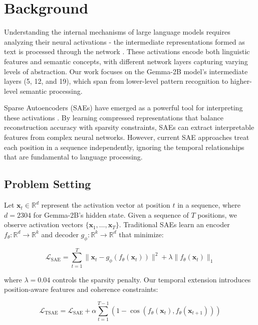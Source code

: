 \section{Background}
Understanding the internal mechanisms of large language models requires analyzing their neural activations - the intermediate representations formed as text is processed through the network \cite{elhage2022solu}. These activations encode both linguistic features and semantic concepts, with different network layers capturing varying levels of abstraction. Our work focuses on the Gemma-2B model's intermediate layers (5, 12, and 19), which span from lower-level pattern recognition to higher-level semantic processing.

Sparse Autoencoders (SAEs) have emerged as a powerful tool for interpreting these activations \cite{anthropic2022decomposition}. By learning compressed representations that balance reconstruction accuracy with sparsity constraints, SAEs can extract interpretable features from complex neural networks. However, current SAE approaches treat each position in a sequence independently, ignoring the temporal relationships that are fundamental to language processing.

\subsection{Problem Setting}
Let $\mathbf{x}_t \in \mathbb{R}^d$ represent the activation vector at position $t$ in a sequence, where $d=2304$ for Gemma-2B's hidden state. Given a sequence of $T$ positions, we observe activation vectors $\{\mathbf{x}_1, \ldots, \mathbf{x}_T\}$. Traditional SAEs learn an encoder $f_\theta\colon \mathbb{R}^d \rightarrow \mathbb{R}^k$ and decoder $g_\phi\colon \mathbb{R}^k \rightarrow \mathbb{R}^d$ that minimize:

\begin{equation}
\mathcal{L}_{\text{SAE}} = \sum_{t=1}^T \|\mathbf{x}_t - g_\phi(f_\theta(\mathbf{x}_t))\|^2 + \lambda\|f_\theta(\mathbf{x}_t)\|_1
\end{equation}

where $\lambda=0.04$ controls the sparsity penalty. Our temporal extension introduces position-aware features and coherence constraints:

\begin{equation}
\mathcal{L}_{\text{TSAE}} = \mathcal{L}_{\text{SAE}} + \alpha \sum_{t=1}^{T-1} (1 - \cos(f_\theta(\mathbf{x}_t), f_\theta(\mathbf{x}_{t+1})))
\end{equation}

